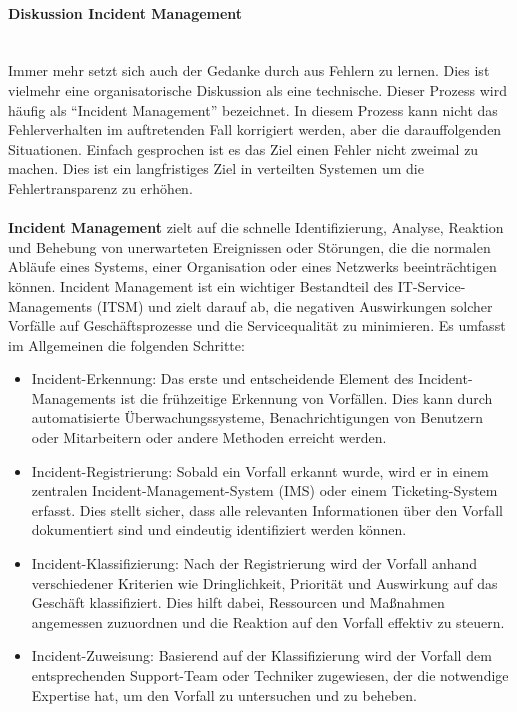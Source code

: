\documentclass[../vs-script-first-v01.tex]{subfiles}
\begin{document}
\begin{itemize}
        \paragraph{Diskussion Incident Management}\mbox{}\\
        Immer mehr setzt sich auch der Gedanke durch aus Fehlern zu lernen. Dies ist vielmehr eine organisatorische Diskussion als eine technische. Dieser Prozess wird häufig als \enquote{Incident Management} bezeichnet. In diesem Prozess kann nicht das Fehlerverhalten im auftretenden Fall korrigiert werden, aber die darauffolgenden Situationen. Einfach gesprochen ist es das Ziel einen Fehler nicht zweimal zu machen. Dies ist ein langfristiges Ziel in verteilten Systemen um die Fehlertransparenz zu erhöhen.
        \\\\
        \textbf{Incident Management} zielt auf die schnelle Identifizierung, Analyse, Reaktion und Behebung von unerwarteten Ereignissen oder Störungen, die die normalen Abläufe eines Systems, einer Organisation oder eines Netzwerks beeinträchtigen können. Incident Management ist ein wichtiger Bestandteil des IT-Service-Managements (ITSM) und zielt darauf ab, die negativen Auswirkungen solcher Vorfälle auf Geschäftsprozesse und die Servicequalität zu minimieren. Es umfasst im Allgemeinen die folgenden Schritte:
        \begin{itemize}
          \item Incident-Erkennung: Das erste und entscheidende Element des Incident-Managements ist die frühzeitige Erkennung von Vorfällen. Dies kann durch automatisierte Überwachungssysteme, Benachrichtigungen von Benutzern oder Mitarbeitern oder andere Methoden erreicht werden.
          \item Incident-Registrierung: Sobald ein Vorfall erkannt wurde, wird er in einem zentralen Incident-Management-System (IMS) oder einem Ticketing-System erfasst. Dies stellt sicher, dass alle relevanten Informationen über den Vorfall dokumentiert sind und eindeutig identifiziert werden können.
          \item Incident-Klassifizierung: Nach der Registrierung wird der Vorfall anhand verschiedener Kriterien wie Dringlichkeit, Priorität und Auswirkung auf das Geschäft klassifiziert. Dies hilft dabei, Ressourcen und Maßnahmen angemessen zuzuordnen und die Reaktion auf den Vorfall effektiv zu steuern.
          \item Incident-Zuweisung: Basierend auf der Klassifizierung wird der Vorfall dem entsprechenden Support-Team oder Techniker zugewiesen, der die notwendige Expertise hat, um den Vorfall zu untersuchen und zu beheben.

\end{itemize}
\end{itemize}
\end{document}
